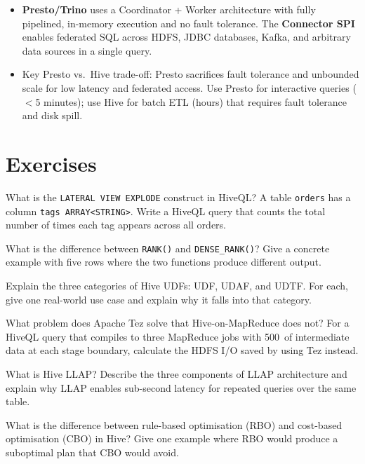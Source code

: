 \begin{itemize}
  \item \textbf{Presto/Trino} uses a Coordinator + Worker architecture
        with fully pipelined, in-memory execution and no fault tolerance.
        The \textbf{Connector SPI} enables federated SQL across HDFS,
        JDBC databases, Kafka, and arbitrary data sources in a single
        query.

  \item Key Presto vs.\ Hive trade-off: Presto sacrifices fault tolerance
        and unbounded scale for low latency and federated access. Use
        Presto for interactive queries ($<$5 minutes); use Hive for batch
        ETL (hours) that requires fault tolerance and disk spill.
\end{itemize}

\section*{Exercises}
\label{sec:ch7-exercises}


\sq What is the \texttt{LATERAL VIEW EXPLODE} construct in HiveQL?
A table \texttt{orders} has a column \texttt{tags ARRAY<STRING>}.
Write a HiveQL query that counts the total number of times each tag
appears across all orders.

\sq What is the difference between \texttt{RANK()} and
\texttt{DENSE\_RANK()}? Give a concrete example with five rows where the
two functions produce different output.

\sq Explain the three categories of Hive UDFs: UDF, UDAF, and UDTF.
For each, give one real-world use case and explain why it falls into
that category.

\sq What problem does Apache Tez solve that Hive-on-MapReduce does not?
For a HiveQL query that compiles to three MapReduce jobs with 500\MB\
of intermediate data at each stage boundary, calculate the HDFS I/O
saved by using Tez instead.

\sq What is Hive LLAP? Describe the three components of LLAP architecture
and explain why LLAP enables sub-second latency for repeated queries
over the same table.

\sq What is the difference between rule-based optimisation (RBO) and
cost-based optimisation (CBO) in Hive? Give one example where RBO would
produce a suboptimal plan that CBO would avoid.

